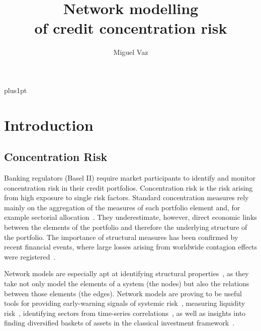 \documentclass[12pt,beltcrest]{ociamthesis} %
\title{Network modelling \\[1ex]
of credit concentration risk}
\author{Miguel Vaz}        %
\begin{document}
\baselineskip=18pt plus1pt

\setcounter{secnumdepth}{3}
\setcounter{tocdepth}{3}


\maketitle                  %

\begin{romanpages}          %
\tableofcontents            %
\listoffigures              %
\end{romanpages}            %

\chapter{Introduction}
\section{Concentration Risk} %
\label{sec:concentration_risk}



Banking regulators (Basel II) require market participants to identify and monitor concentration risk in their credit portfolios. Concentration risk is the risk arising from high exposure to single risk factors. Standard concentration measures rely mainly on the aggregation of the measures of each portfolio element and, for example sectorial allocation~\citep{lutkebohmert2008concentration}.
They underestimate, however, direct economic links between the elements of the portfolio and therefore the underlying structure of the portfolio.
The importance of structural measures has been confirmed by recent financial events, where large losses arising from worldwide contagion effects were registered~\citep{Kazi:2013vr}.
	
Network models are especially apt at identifying structural properties~\citep{newman2010networks}, as they take not only model the elements of a system (the nodes) but also the relations between those elements (the edges). Network models are proving to be useful tools for providing early-warning signals of systemic risk~\citep{Squartini:2013ev}, measuring liquidity risk~\citep{Karas:2012tp}, identifying sectors from time-series correlations~\citep{Onnela:2004vz,Fenn:2009uf,Fenn:2011kp}, as well as insights into finding diversified baskets of assets in the classical investment framework~\citep{Pozzi:2013ci}.
\end{document}
